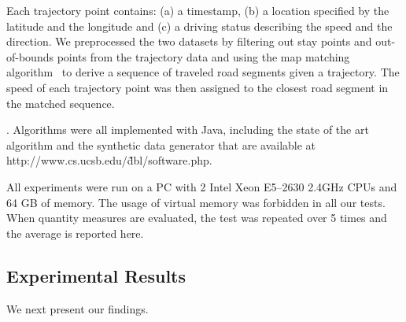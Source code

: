 Each trajectory point contains: (a) a timestamp, (b) a location specified by the latitude and the longitude and (c) a driving status describing the speed and the direction. We preprocessed the two datasets by filtering out stay points and out-of-bounds points from the trajectory data and using the map matching algorithm~\cite{Newson2009MM} to derive a sequence of traveled road segments given a trajectory. The speed of each trajectory point was then assigned to the closest road segment in the matched sequence.


.
Algorithms were all implemented with Java, including the state of the art algorithm  and the synthetic data generator that are available at {\small http://www.cs.ucsb.edu/\~dbl/software.php}.

All experiments were run on a PC with 2 Intel Xeon
E5--2630 2.4GHz CPUs and 64 GB of memory. The usage of virtual memory was forbidden in all our tests. When quantity measures are evaluated, the test was repeated over 5 times and the average is reported here.



\subsection{Experimental Results}

We next present our findings.
